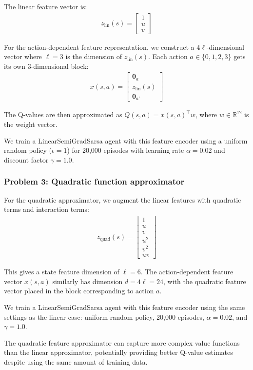 \documentclass[12pt,twoside]{article}
\begin{document}
The linear feature vector is:
\begin{align}
z_{\text{lin}}(s) = \begin{bmatrix} 1 \\ u \\ v \end{bmatrix}
\end{align}

For the action-dependent feature representation, we construct a $4\ell$-dimensional vector where $\ell = 3$ is the dimension of $z_{\text{lin}}(s)$. Each action $a \in \{0, 1, 2, 3\}$ gets its own 3-dimensional block:
\begin{align}
x(s, a) = \begin{bmatrix} \mathbf{0}_{a} \\ z_{\text{lin}}(s) \\ \mathbf{0}_{a'} \end{bmatrix}
\end{align}

The Q-values are then approximated as $Q(s,a) = x(s,a)^\top w$, where $w \in \mathbb{R}^{12}$ is the weight vector.

We train a LinearSemiGradSarsa agent with this feature encoder using a uniform random policy ($\epsilon = 1$) for 20,000 episodes with learning rate $\alpha = 0.02$ and discount factor $\gamma = 1.0$.

\subsubsection*{{\color{red}Problem 3: Quadratic function approximator}}

For the quadratic approximator, we augment the linear features with quadratic terms and interaction terms:
\begin{align}
z_{\text{quad}}(s) = \begin{bmatrix} 1 \\ u \\ v \\ u^2 \\ v^2 \\ uv \end{bmatrix}
\end{align}

This gives a state feature dimension of $\ell = 6$. The action-dependent feature vector $x(s,a)$ similarly has dimension $d = 4\ell = 24$, with the quadratic feature vector placed in the block corresponding to action $a$.

We train a LinearSemiGradSarsa agent with this feature encoder using the same settings as the linear case: uniform random policy, 20,000 episodes, $\alpha = 0.02$, and $\gamma = 1.0$.

The quadratic feature approximator can capture more complex value functions than the linear approximator, potentially providing better Q-value estimates despite using the same amount of training data.
\end{document}
